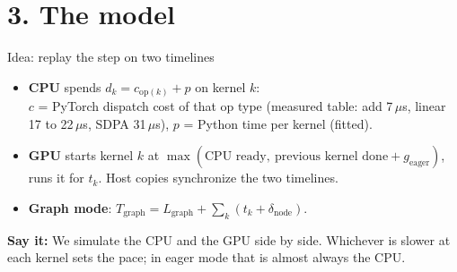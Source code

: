 \documentclass[aspectratio=169,10pt]{beamer}
\newcommand{\say}[1]{\par\vfill\noindent\colorbox{soft}{\parbox{\dimexpr\textwidth-2\fboxsep\relax}{\small\textbf{\textcolor{accent}{Say it:}} #1}}}
\begin{document}
\section{3. The model}

\begin{frame}{Idea: replay the step on two timelines}
\vspace{0.4em}
\begin{itemize}
\item \textbf{CPU} spends $d_k = c_{\mathrm{op}(k)} + p$ on kernel $k$:\\
  $c$ = PyTorch dispatch cost of that op type (measured table: add 7\,$\mu$s, linear 17 to
  22\,$\mu$s, SDPA 31\,$\mu$s), $p$ = Python time per kernel (fitted).
\item \textbf{GPU} starts kernel $k$ at $\max(\text{CPU ready},\ \text{previous kernel done} + g_{\mathrm{eager}})$,
  runs it for $t_k$. Host copies synchronize the two timelines.
\item \textbf{Graph mode}: $T_{\mathrm{graph}} = L_{\mathrm{graph}} + \sum_k (t_k + \delta_{\mathrm{node}})$.
\end{itemize}
\say{We simulate the CPU and the GPU side by side. Whichever is slower at each kernel sets the
pace; in eager mode that is almost always the CPU.}
\end{frame}
\end{document}
